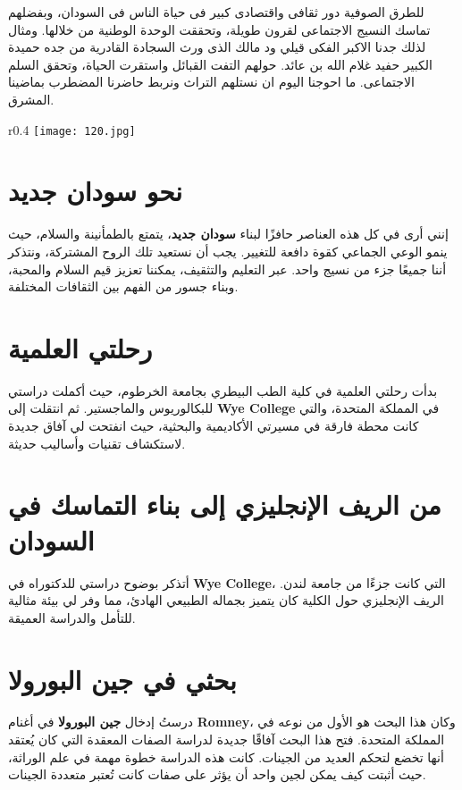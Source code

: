\documentclass[12pt]{article}
\begin{document}
\vspace{.2cm}

\begin{arabtext}
{ \hspace{.1cm} للطرق الصوفية دور ثقافى واقتصادى كبير فى حياة الناس فى السودان، وبفضلهم تماسك النسيج الاجتماعى لقرون طويلة، وتحققت الوحدة الوطنية من خلالها. ومثال لذلك جدنا الاكبر الفكى قيلي ود مالك الذى ورث السجادة القادرية من جده حميدة الكبير حفيد غلام الله بن عائد. حولهم التفت القبائل واستقرت الحياة، وتحقق السلم الاجتماعى. ما احوجنا اليوم ان نستلهم التراث ونربط حاضرنا المضطرب بماضينا المشرق.}
\end{arabtext}
\begin{wrapfigure}{r}{0.4\textwidth}
\texttt{[image: 120.jpg]}
\end{wrapfigure}

\section{نحو سودان جديد}
إنني أرى في كل هذه العناصر حافزًا لبناء \textbf{سودان جديد}، يتمتع بالطمأنينة والسلام، حيث ينمو الوعي الجماعي كقوة دافعة للتغيير.  
يجب أن نستعيد تلك الروح المشتركة، ونتذكر أننا جميعًا جزء من نسيج واحد. عبر التعليم والتثقيف، يمكننا تعزيز قيم السلام والمحبة، وبناء جسور من الفهم بين الثقافات المختلفة.  

\section{رحلتي العلمية}
بدأت رحلتي العلمية في كلية الطب البيطري بجامعة الخرطوم، حيث أكملت دراستي للبكالوريوس والماجستير.  
ثم انتقلت إلى \textbf{Wye College} في المملكة المتحدة، والتي كانت محطة فارقة في مسيرتي الأكاديمية والبحثية، حيث انفتحت لي آفاق جديدة لاستكشاف تقنيات وأساليب حديثة.

\section{من الريف الإنجليزي إلى بناء التماسك في السودان}
أتذكر بوضوح دراستي للدكتوراه في \textbf{Wye College}، التي كانت جزءًا من جامعة لندن. الريف الإنجليزي حول الكلية كان يتميز بجماله الطبيعي الهادئ، مما وفر لي بيئة مثالية للتأمل والدراسة العميقة.

\section{بحثي في جين البورولا}
درستُ إدخال \textbf{جين البورولا} في أغنام \textbf{Romney}، وكان هذا البحث هو الأول من نوعه في المملكة المتحدة.  
فتح هذا البحث آفاقًا جديدة لدراسة الصفات المعقدة التي كان يُعتقد أنها تخضع لتحكم العديد من الجينات.  
كانت هذه الدراسة خطوة مهمة في علم الوراثة، حيث أثبتت كيف يمكن لجين واحد أن يؤثر على صفات كانت تُعتبر متعددة الجينات.
\end{document}
